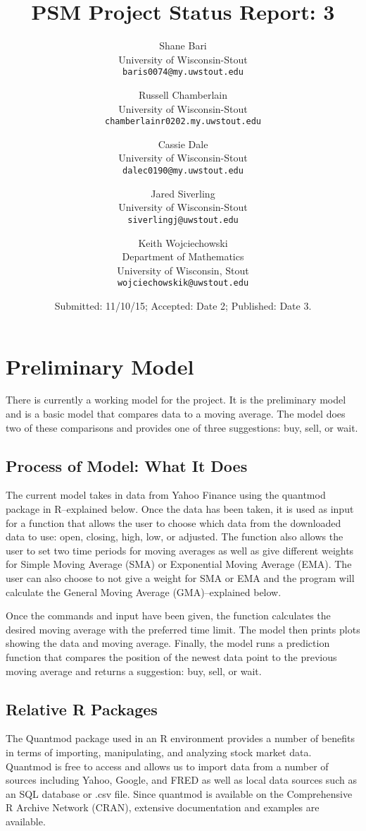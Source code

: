 \documentclass[11pt]{article}
\title{PSM Project Status Report: 3}
\author{
Shane Bari\\
\small University of Wisconsin-Stout\\[-0.8ex]
\small \texttt{baris0074@my.uwstout.edu}
\and
Russell Chamberlain\\
\small University of Wisconsin-Stout\\[-0.8ex]
\small \texttt{chamberlainr0202.my.uwstout.edu}
\and
Cassie Dale\\
\small University of Wisconsin-Stout\\[-0.8ex]
\small \texttt{dalec0190@my.uwstout.edu}
\and
Jared Siverling\\
\small University of Wisconsin-Stout\\[-0.8ex]
\small \texttt{siverlingj@uwstout.edu}
\and
Keith Wojciechowski\\
\small Department of Mathematics\\[-0.8ex]
\small University of Wisconsin, Stout\\[-0.8ex]
\small \texttt{wojciechowskik@uwstout.edu}
}
\date{\small Submitted: 11/10/15;  Accepted: Date 2;  Published: Date 3.}
\begin{document}
\maketitle



\section*{\hspace{-.5cm} Preliminary Model}\label{PM}
There is currently a working model for the project. It is the preliminary model and is a basic model that compares data to a moving average. The model does two of these comparisons and provides one of three suggestions: buy, sell, or wait.

\subsection*{Process of Model: What It Does}\label{PMWID}
The current model takes in data from Yahoo Finance using the quantmod package in R--explained below. Once the data has been taken, it is used as input for a function that allows the user to choose which data from the downloaded data to use: open, closing, high, low, or adjusted. The function also allows the user to set two time periods for moving averages as well as give different weights for Simple Moving Average (SMA) or Exponential Moving Average (EMA). The user can also choose to not give a weight for SMA or EMA and the program will calculate the General Moving Average (GMA)--explained below.

Once the commands and input have been given, the function calculates the desired moving average with the preferred time limit. The model then prints plots showing the data and moving average. Finally, the model runs a prediction function that compares the position of the newest data point to the previous moving average and returns a suggestion: buy, sell, or wait.

\subsection*{Relative R Packages}\label{RRP}
The Quantmod package used in an R environment provides a number of benefits in terms of importing, manipulating, and analyzing stock market data. Quantmod is free to access and allows us to import data from a number of sources including Yahoo, Google, and FRED as well as local data sources such as an SQL database or .csv file. Since quantmod is available on the Comprehensive R Archive Network (CRAN), extensive documentation and examples are available.\textsuperscript{\cite{QMOD}}
\end{document}
